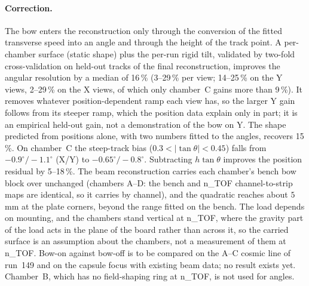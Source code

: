 \paragraph{Correction.}
The bow enters the reconstruction only through the conversion of the fitted transverse speed into an angle and through
the height of the track point. A per-chamber surface (static shape) plus the per-run rigid tilt, validated by two-fold
cross-validation on held-out tracks of the final reconstruction, improves the angular resolution by a median of 16\,\% (3--29\,\% per view;
14--25\,\% on the Y views, 2--29\,\% on the X views, of which only chamber~C gains more than 9\,\%). It removes whatever position-dependent ramp each view has, so
the larger Y gain follows from its steeper ramp, which the position data explain only in part; it is an empirical held-out gain, not a demonstration of the bow on Y. The
shape predicted from positions alone, with two numbers fitted to the angles, recovers 15\,\%. On chamber~C the steep-track
bias ($0.3<|\tan\theta|<0.45$) falls from $-0.9^\circ/-1.1^\circ$ (X/Y) to $-0.65^\circ/-0.8^\circ$. Subtracting
$h\tan\theta$ improves the position residual by 5--18\,\%. The beam reconstruction carries each chamber's bench bow block over unchanged
(chambers A--D: the bench and n\_TOF channel-to-strip maps are identical, so it carries by channel), and the quadratic reaches about $5$\,mm at the plate
corners, beyond the range fitted on the bench. The load depends on mounting, and the chambers stand vertical at n\_TOF, where the gravity part of the
load acts in the plane of the board rather than across it, so the carried surface is an assumption about the chambers, not a measurement of them at
n\_TOF. Bow-on against bow-off is to be compared on the A--C cosmic line of run~149 and on the capsule focus with existing beam data; no result exists yet.
Chamber~B, which has no field-shaping ring at n\_TOF, is not used for angles.

